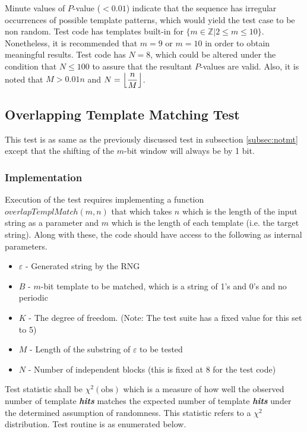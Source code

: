 Minute values of $P$-value ($< 0.01$) indicate that the sequence has irregular occurrences of possible template patterns, which would yield the test case to be non random. Test code has templates built-in for $\{m \in \mathbb{Z}|2 \leq m \leq 10\}$. Nonetheless, it is recommended that $m=9$ or $m=10$ in order to obtain meaningful results. Test code has $N=8$, which could be altered under the condition that $N \leq 100$ to assure that the resultant $P$-values are valid. Also, it is noted that $M > 0.01n$ and $N = \floor*{\dfrac{n}{M}}$.

\subsection{Overlapping Template Matching Test}

This test is as same as the previously discussed test in subsection \ref{subsec:notmt} except that the shifting of the $m$-bit window will always be by 1 bit.

\subsubsection{Implementation}

Execution of the test requires implementing a function $overlapTemplMatch(m,n)$ that which takes $n$ which is the length of the input string as a parameter and $m$ which is the length of each template (i.e. the target string). Along with these, the code should have access to the following as internal parameters.

\begin{itemize}
    \item $\varepsilon$ - Generated string by the RNG
    \item $B$ - $m$-bit template to be matched, which is a string of 1's and 0's and no periodic
    \item $K$ -  The degree of freedom. (Note: The test suite has a fixed value for this set to 5)
    \item $M$ - Length of the substring of $\varepsilon$ to be tested
    \item $N$ - Number of independent blocks (this is fixed at 8 for the test code)
\end{itemize}

Test statistic shall be $\chi^2(\text{obs})$ which is a measure of how well the observed number of template \textit{\textbf{hits}} matches the expected number of template \textit{\textbf{hits}} under the determined assumption of randomness. This statistic refers to a $\chi^2$  distribution. Test routine is as enumerated below.

